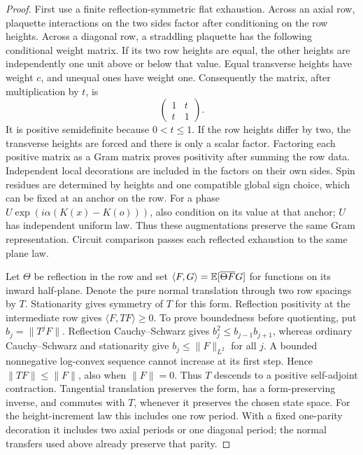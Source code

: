\begin{proof}
First use a finite reflection-symmetric flat exhaustion. Across an axial row,
plaquette interactions on the two sides factor after conditioning on the row
heights. Across a diagonal row, a straddling plaquette has the following
conditional weight matrix. If its two row heights are equal, the other
heights are independently one unit above or below that value. Equal
transverse heights have weight $c$, and unequal ones have weight one.
Consequently the matrix, after multiplication by $t$, is
\[
 \begin{pmatrix}1&t\\t&1\end{pmatrix}.
\]
It is positive semidefinite because $0<t\le1$. If the row heights differ
by two, the transverse heights are forced and there is only a scalar factor.
Factoring each positive matrix as a Gram matrix proves positivity after
summing the row data. Independent local decorations are included in the
factors on their own sides. Spin residues are determined by heights and one
compatible global sign choice, which can be fixed at an anchor on the row.
For a phase $U\exp(i\alpha(K(x)-K(o)))$, also condition on its value at that
anchor; $U$ has independent uniform law. Thus these augmentations preserve
the same Gram representation. Circuit comparison passes each reflected
exhaustion to the same plane law.

Let $\Theta$ be reflection in the row and set
$\langle F,G\rangle=\mathbb E[\overline{\Theta F}G]$ for functions on its inward
half-plane. Denote the pure normal translation through two row spacings by
$T$. Stationarity gives symmetry of $T$ for this form. Reflection positivity
at the intermediate row gives $\langle F,TF\rangle\ge0$. To prove boundedness
before quotienting, put $b_j=\|T^jF\|$. Reflection Cauchy--Schwarz gives
$b_j^2\le b_{j-1}b_{j+1}$, whereas ordinary Cauchy--Schwarz and stationarity
give $b_j\le\|F\|_{L^2}$ for all $j$. A bounded nonnegative log-convex
sequence cannot increase at its first step. Hence $\|TF\|\le\|F\|$, also
when $\|F\|=0$. Thus $T$ descends to a positive self-adjoint contraction.
Tangential translation preserves the form, has a form-preserving inverse,
and commutes with $T$, whenever it preserves the chosen state space. For
the height-increment law this includes one row period. With a fixed
one-parity decoration it includes two axial periods or one diagonal period;
the normal transfers used above already preserve that parity.
\end{proof}

